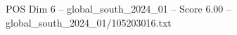 \begin{textsample}{POS Dim 6 – global\_south\_2024\_01 – Score 6.00 – global\_south\_2024\_01/105203016.txt}
\end{textsample}
